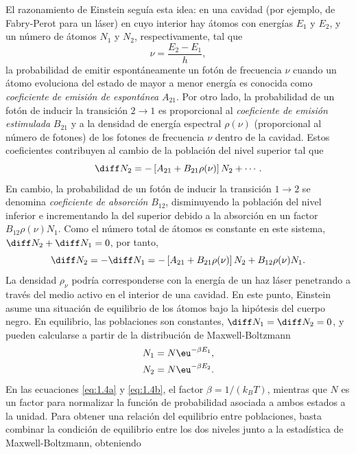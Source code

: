 El razonamiento de Einstein seguía esta idea: en una cavidad (por ejemplo, de Fabry-Perot para un láser) en cuyo interior hay átomos con energías $E_{1}$ y $E_{2}$, y un número de átomos $N_{1}$ y $N_{2}$, respectivamente, tal que 
\begin{equation}\label{eq:1.1}
  \nu = \frac{E_{2}-E_{1}}{h},
\end{equation}
la probabilidad de emitir espontáneamente un fotón de frecuencia $\nu$ cuando un átomo evoluciona del estado de mayor a menor energía es conocida como \emph{coeficiente de emisión de espontánea} $A_{21}$. Por otro lado, la probabilidad de un fotón de inducir la transición $2 \rightarrow 1$ es proporcional al \emph{coeficiente de emisión estimulada} $B_{21}$ y a la densidad de energía espectral $\rho(\nu)$ (proporcional al número de fotones) de los fotones de frecuencia $\nu$ dentro de la cavidad. Estos coeficientes contribuyen al cambio de la población del nivel superior tal que 
\begin{equation}\label{eq:1.2}
  \diff N_{2} = -\left[A_{21} + B_{21} \rho(\nu)\right]N_{2} + \cdots.
\end{equation}
En cambio, la probabilidad de un fotón de inducir la transición $1 \rightarrow 2$ se denomina \emph{coeficiente de absorción} $B_{12}$, disminuyendo la población del nivel inferior e incrementando la del superior debido a la absorción en un factor $B_{12} \rho(\nu)N_{1}$. Como el número total de átomos es constante en este sistema, $\diff N_{2}+\diff N_{1}=0$, por tanto,
\begin{equation}\label{eq:1.3}
  \diff N_{2} = -\diff N_{1} = -\left[A_{21} + B_{21} \rho(\nu)\right]N_{2} + B_{12} \rho(\nu)N_{1}.
\end{equation}
La densidad $\rho_{\nu}$ podría corresponderse con la energía de un haz láser penetrando a través del medio activo en el interior de una cavidad. En este punto, Einstein asume una situación de equilibrio de los átomos bajo la hipótesis del cuerpo negro. En equilibrio, las poblaciones son constantes, $\diff N_{1} = \diff N_{2} = 0$, y pueden calcularse a partir de la distribución de Maxwell-Boltzmann \autocite{Feynman2011} 
\begin{align}
  \label{eq:1.4a}
  N_{1} &= N \eu^{-\beta E_{1}}, \\
  \label{eq:1.4b}
  N_{2} &= N \eu^{-\beta E_{2}}.
\end{align}
En las ecuaciones \eqref{eq:1.4a} y \eqref{eq:1.4b}, el factor $\beta = 1/(k_{B}T)$, mientras que $N$ es un factor para normalizar la función de probabilidad asociada a ambos estados a la unidad. Para obtener una relación del equilibrio entre poblaciones, basta combinar la condición de equilibrio entre los dos niveles junto a la estadística de Maxwell-Boltzmann, obteniendo 
